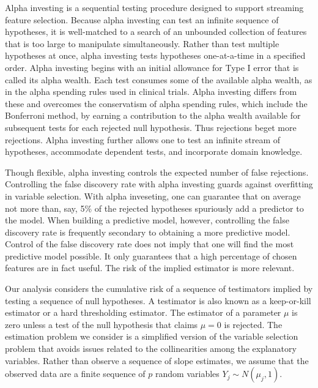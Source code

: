\documentclass[12pt]{article}
\begin{document}
 Alpha investing \citep{fosterstine08} is a sequential testing procedure
 designed to support streaming feature selection.  Because alpha investing can
 test an infinite sequence of hypotheses, it is well-matched to a search of an
 unbounded collection of features that is too large to manipulate
 simultaneously.  Rather than test multiple hypotheses at once, alpha investing
 tests hypotheses one-at-a-time in a specified order.  Alpha investing begins
 with an initial allowance for Type I error that is called its alpha wealth.
  Each test consumes some of the available alpha wealth, as in the alpha
 spending rules used in clinical trials.  Alpha investing differs from these and
 overcomes the conservatism of alpha spending rules, which include the
 Bonferroni method, by earning a contribution to the alpha wealth available for
 subsequent tests for each rejected null hypothesis.  Thus rejections beget more
 rejections.  Alpha investing further allows one to test an infinite stream of
 hypotheses, accommodate dependent tests, and incorporate domain knowledge.
 

 Though flexible, alpha investing controls the expected number of false
 rejections.  Controlling the false discovery rate with alpha investing guards
 against overfitting in variable selection.  With alpha inveseting, one can
 guarantee that on average not more than, say, 5\% of the rejected hypotheses
 spuriously add a predictor to the model.  When building a predictive model,
 however, controlling the false discovery rate is frequently secondary to
 obtaining a more predictive model.  Control of the false discovery rate does
 not imply that one will find the most predictive model possible.  It only
 guarantees that a high percentage of chosen features are in fact useful.  The
 risk of the implied estimator is more relevant.


 Our analysis considers the cumulative risk of a sequence of testimators implied
 by testing a sequence of null hypotheses.  A testimator is also known as a
 keep-or-kill estimator or a hard thresholding estimator.  The estimator of a
 parameter $\mu$ is zero unless a test of the null hypothesis that claims $\mu =
 0$ is rejected.  The estimation problem we consider is a simplified version of
 the variable selection problem that avoids issues related to the collinearities
 among the explanatory variables.  Rather than observe a sequence of slope
 estimates, we assume that the observed data are a finite sequence of $p$ random
 variables $Y_j \sim N(\mu_j,1)$.
\end{document}

